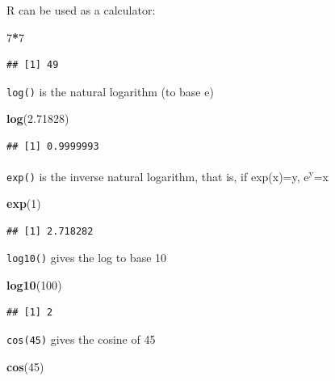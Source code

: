 \documentclass[]{book}
\newenvironment{Shaded}{\begin{snugshade}}{\end{snugshade}}
\newcommand{\DecValTok}[1]{\textcolor[rgb]{0.00,0.00,0.81}{#1}}
\newcommand{\FloatTok}[1]{\textcolor[rgb]{0.00,0.00,0.81}{#1}}
\newcommand{\KeywordTok}[1]{\textcolor[rgb]{0.13,0.29,0.53}{\textbf{#1}}}
\newcommand{\NormalTok}[1]{#1}
\newcommand{\OperatorTok}[1]{\textcolor[rgb]{0.81,0.36,0.00}{\textbf{#1}}}
\begin{document}
R can be used as a calculator:

\begin{Shaded}
\begin{Highlighting}[]
\DecValTok{7}\OperatorTok{*}\DecValTok{7}
\end{Highlighting}
\end{Shaded}

\begin{verbatim}
## [1] 49
\end{verbatim}

\texttt{log()} is the natural logarithm (to base e)

\begin{Shaded}
\begin{Highlighting}[]
\KeywordTok{log}\NormalTok{(}\FloatTok{2.71828}\NormalTok{)}
\end{Highlighting}
\end{Shaded}

\begin{verbatim}
## [1] 0.9999993
\end{verbatim}

\texttt{exp()} is the inverse natural logarithm, that is, if exp(x)=y, e\textsuperscript{y}=x

\begin{Shaded}
\begin{Highlighting}[]
\KeywordTok{exp}\NormalTok{(}\DecValTok{1}\NormalTok{)}
\end{Highlighting}
\end{Shaded}

\begin{verbatim}
## [1] 2.718282
\end{verbatim}

\texttt{log10()} gives the log to base 10

\begin{Shaded}
\begin{Highlighting}[]
\KeywordTok{log10}\NormalTok{(}\DecValTok{100}\NormalTok{)}
\end{Highlighting}
\end{Shaded}

\begin{verbatim}
## [1] 2
\end{verbatim}

\texttt{cos(45)} gives the cosine of 45

\begin{Shaded}
\begin{Highlighting}[]
\KeywordTok{cos}\NormalTok{(}\DecValTok{45}\NormalTok{)}
\end{Highlighting}
\end{Shaded}
\end{document}
